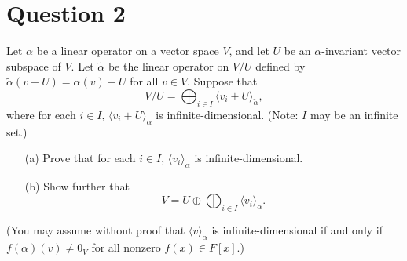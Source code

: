 \documentclass[12pt]{article}
\begin{document}
\section*{Question 2}
Let $\alpha$ be a linear operator on a vector space $V$, and let $U$ be an $\alpha$-invariant vector subspace of $V$. Let $\widetilde{\alpha}$ be the linear operator on $V/U$ defined by $\widetilde{\alpha}(v + U) = \alpha(v) + U$ for all $v \in V$.
Suppose that
\[
V / U = \bigoplus_{i \in I} \langle v_i + U \rangle_{\widetilde{\alpha}},
\]
where for each \(i \in I\), \(\langle v_i + U \rangle_{\widetilde{\alpha}}\) is infinite-dimensional. (Note: \(I\) may be an infinite set.)

\begin{enumerate}
    \item[(a)] Prove that for each \(i \in I\), \(\langle v_i \rangle_{\alpha}\) is infinite-dimensional.
    \item[(b)] Show further that
    \[
    V = U \oplus \bigoplus_{i \in I} \langle v_i \rangle_{\alpha}.
    \]
\end{enumerate}
(You may assume without proof that \(\langle v \rangle_{\alpha}\) is infinite-dimensional if and only if \(f(\alpha)(v) \neq 0_V\) for all nonzero \(f(x) \in F[x]\).) \\
\end{document}
